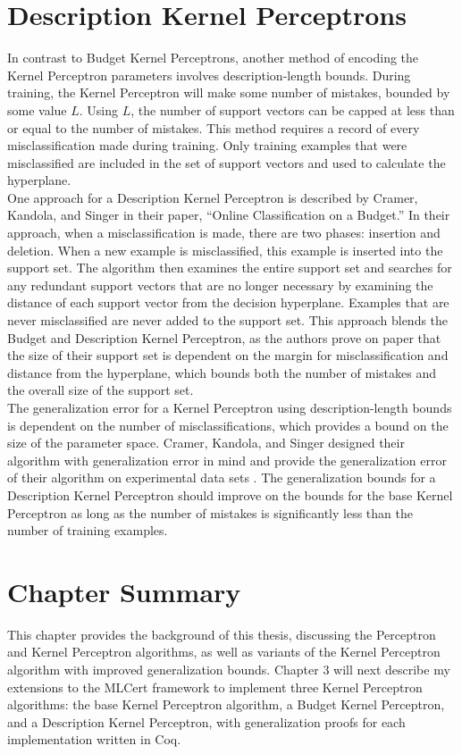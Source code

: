 \section{Description Kernel Perceptrons}\label{DescriptionKernelPerceptronSection}
In contrast to Budget Kernel Perceptrons, another method of encoding the Kernel Perceptron parameters involves description-length bounds. During training, the Kernel Perceptron will make some number of mistakes, bounded by some value $L$. Using $L$, the number of support vectors can be capped at less than or equal to the number of mistakes. This method requires a record of every misclassification made during training. Only training examples that were misclassified are included in the set of support vectors and used to calculate the hyperplane.
\\One approach for a Description Kernel Perceptron is described by Cramer, Kandola, and Singer \cite{CKS03} in their paper, ``Online Classification on a Budget.'' In their approach, when a misclassification is made, there are two phases: insertion and deletion. When a new example is misclassified, this example is inserted into the support set. The algorithm then examines the entire support set and searches for any redundant support vectors that are no longer necessary by examining the distance of each support vector from the decision hyperplane. Examples that are never misclassified are never added to the support set. This approach blends the Budget and Description Kernel Perceptron, as the authors prove on paper that the size of their support set is dependent on the margin for misclassification and distance from the hyperplane, which bounds both the number of mistakes and the overall size of the support set. 
\\The generalization error for a Kernel Perceptron using description-length bounds is dependent on the number of misclassifications, which provides a bound on the size of the parameter space. Cramer, Kandola, and Singer designed their algorithm with generalization error in mind and provide the generalization error of their algorithm on experimental data sets \cite{CKS03}. The generalization bounds for a Description Kernel Perceptron should improve on the bounds for the base Kernel Perceptron as long as the number of mistakes is significantly less than the number of training examples.
\section{Chapter Summary}\label{BackgroundChapterSummarySection}
This chapter provides the background of this thesis, discussing the Perceptron and Kernel Perceptron algorithms, as well as variants of the Kernel Perceptron algorithm with improved generalization bounds. Chapter 3 will next describe my extensions to the MLCert framework to implement three Kernel Perceptron algorithms: the base Kernel Perceptron algorithm, a Budget Kernel Perceptron, and a Description Kernel Perceptron, with generalization proofs for each implementation written in Coq.
